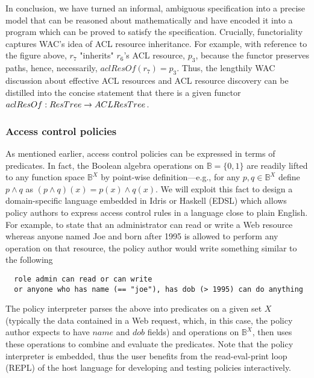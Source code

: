 In conclusion, we have turned an informal, ambiguous specification
into a precise model that can be reasoned about mathematically and
have encoded it into a program which can be proved to satisfy the
specification. Crucially, functoriality captures WAC's idea of ACL
resource inheritance. For example, with reference to the figure above,
$r_7$ "inherits" $r_6$'s ACL resource, $p_3$, because the functor
preserves paths, hence, necessarily, $aclResOf(r_7) = p_3$. Thus,
the lengthily WAC discussion about effective ACL resources and ACL
resource discovery can be distilled into the concise statement that
there is a given functor  $aclResOf : ResTree \rightarrow ACLResTree$.


\subsubsection{Access control policies}
As mentioned earlier, access control policies can be expressed in
terms of predicates. In fact, the Boolean algebra operations on
$\mathbb{B} = \{0,1\}$ are readily lifted to any function space
$\mathbb{B}^X$ by point-wise definition---e.g., for any $p,q \in \mathbb{B}^X$
define $p \wedge q$ as $(p \wedge q)(x) = p(x) \wedge q(x)$. We will
exploit this fact to design a domain-specific language embedded in
Idris or Haskell (EDSL\cite{gibbons2014folding}) which allows policy
authors to express access control rules in a language close to plain
English. For example, to state that an administrator can read or write
a Web resource whereas anyone named Joe and born after 1995 is allowed
to perform any operation on that resource, the policy author would
write something similar to the following
\begin{lstlisting}
  role admin can read or can write
  or anyone who has name (== "joe"), has dob (> 1995) can do anything
\end{lstlisting}
The policy interpreter parses the above into predicates on a given
set $X$ (typically the data contained in a Web request, which, in
this case, the policy author expects to have $name$ and $dob$ fields)
and operations on $\mathbb{B}^X$, then uses these operations to combine
and evaluate the predicates. Note that the policy interpreter is
embedded, thus the user benefits from the read-eval-print loop
(REPL) of the host language for developing and testing policies
interactively.

